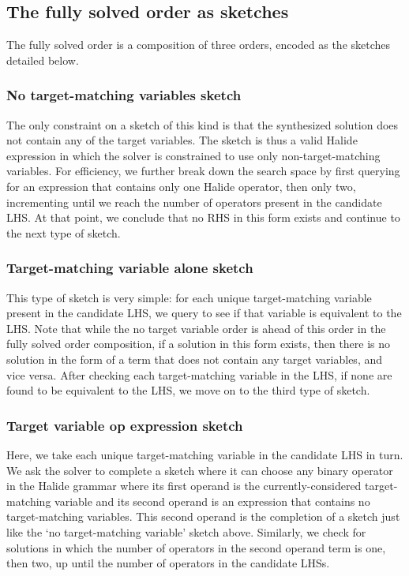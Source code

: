 \subsection{The fully solved order as sketches}

The fully solved order is a composition of three orders, encoded as the sketches detailed below.

\subsubsection{No target-matching variables sketch}
The only constraint on a sketch of this kind is that the synthesized solution does not contain any of the target variables. The sketch is thus a valid Halide expression in which the solver is constrained to use only non-target-matching variables. For efficiency, we further break down the search space by first querying for an expression that contains only one Halide operator, then only two, incrementing until we reach the number of operators present in the candidate LHS. At that point, we conclude that no RHS in this form exists and continue to the next type of sketch.

\subsubsection{Target-matching variable alone sketch}

This type of sketch is very simple: for each unique target-matching variable present in the candidate LHS, we query to see if that variable is equivalent to the LHS. Note that while the no target variable order is ahead of this order in the fully solved order composition, if a solution in this form exists, then there is no solution in the form of a term that does not contain any target variables, and vice versa. After checking each target-matching variable in the LHS, if none are found to be equivalent to the LHS, we move on to the third type of sketch.

\subsubsection{Target variable op expression sketch}
Here, we take each unique target-matching variable in the candidate LHS in turn. We ask the solver to complete a sketch where it can choose any binary operator in the Halide grammar where its first operand is the currently-considered target-matching variable and its second operand is an expression that contains no target-matching variables. This second operand is the completion of a sketch just like the `no target-matching variable' sketch above. Similarly, we check for solutions in which the number of operators in the second operand term is one, then two, up until the number of operators in the candidate LHSs.

